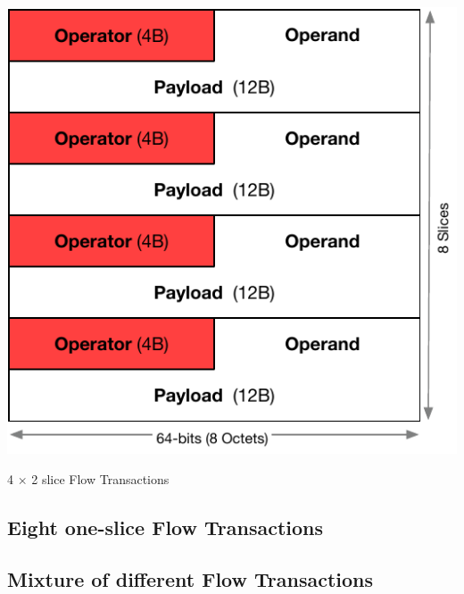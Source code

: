 \documentclass[../HFT-main.tex]{subfiles}
\begin{document}
\begin{marginfigure}
        \includegraphics[width=\linewidth]{../figures/4-flow-subtransactions.pdf}
  \caption{4 $\times$ 2 slice Flow Transactions}
    \vspace{8pt}
\end{marginfigure}

%

\subsection{Eight one-slice  Flow Transactions} 




\subsection{Mixture of different  Flow Transactions} 
\end{document}
